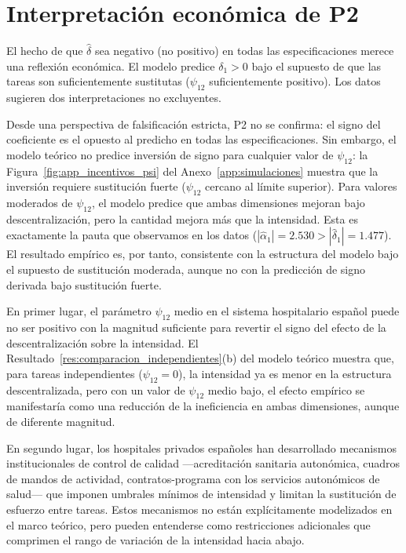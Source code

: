 \documentclass[12pt, a4paper, twoside, openright]{book}
\theoremstyle{plain}
\theoremstyle{definition}
\theoremstyle{remark}
\begin{document}
\section{Interpretación económica de P2}

El hecho de que $\hat{\delta}$ sea negativo (no positivo) en todas las especificaciones merece una reflexión económica. El modelo predice $\delta_1 > 0$ bajo el supuesto de que las tareas son suficientemente sustitutas ($\psi_{12}$ suficientemente positivo). Los datos sugieren dos interpretaciones no excluyentes.

Desde una perspectiva de falsificación estricta, P2 no se confirma: el signo del coeficiente es el opuesto al predicho en todas las especificaciones. Sin embargo, el modelo teórico no predice inversión de signo para cualquier valor de $\psi_{12}$: la Figura~\ref{fig:app_incentivos_psi} del Anexo~\ref{app:simulaciones} muestra que la inversión requiere sustitución fuerte ($\psi_{12}$ cercano al límite superior). Para valores moderados de $\psi_{12}$, el modelo predice que ambas dimensiones mejoran bajo descentralización, pero la cantidad mejora más que la intensidad. Esta es exactamente la pauta que observamos en los datos ($|\hat{\alpha}_1| = 2.530 > |\hat{\delta}_1| = 1.477$). El resultado empírico es, por tanto, consistente con la estructura del modelo bajo el supuesto de sustitución moderada, aunque no con la predicción de signo derivada bajo sustitución fuerte.

En primer lugar, el parámetro $\psi_{12}$ medio en el sistema hospitalario español puede no ser positivo con la magnitud suficiente para revertir el signo del efecto de la descentralización sobre la intensidad. El Resultado~\ref{res:comparacion_independientes}(b) del modelo teórico muestra que, para tareas independientes ($\psi_{12}=0$), la intensidad ya es menor en la estructura descentralizada, pero con un valor de $\psi_{12}$ medio bajo, el efecto empírico se manifestaría como una reducción de la ineficiencia en ambas dimensiones, aunque de diferente magnitud.

En segundo lugar, los hospitales privados españoles han desarrollado mecanismos institucionales de control de calidad ---acreditación sanitaria autonómica, cuadros de mandos de actividad, contratos-programa con los servicios autonómicos de salud--- que imponen umbrales mínimos de intensidad y limitan la sustitución de esfuerzo entre tareas. Estos mecanismos no están explícitamente modelizados en el marco teórico, pero pueden entenderse como restricciones adicionales que comprimen el rango de variación de la intensidad hacia abajo.
\end{document}
